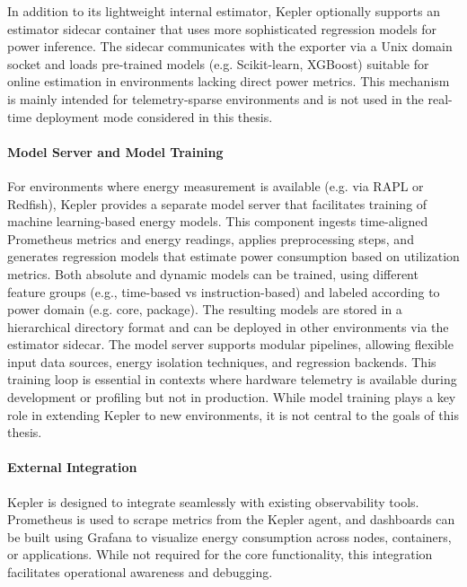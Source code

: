 In addition to its lightweight internal estimator, Kepler optionally supports an estimator sidecar container that uses more sophisticated regression models for power inference. The sidecar communicates with the exporter via a Unix domain socket and loads pre-trained models (e.g. Scikit-learn, XGBoost) suitable for online estimation in environments lacking direct power metrics. This mechanism is mainly intended for telemetry-sparse environments and is not used in the real-time deployment mode considered in this thesis.

\paragraph{Model Server and Model Training}

For environments where energy measurement is available (e.g. via RAPL or Redfish), Kepler provides a separate model server that facilitates training of machine learning-based energy models. This component ingests time-aligned Prometheus metrics and energy readings, applies preprocessing steps, and generates regression models that estimate power consumption based on utilization metrics. Both absolute and dynamic models can be trained, using different feature groups (e.g., time-based vs instruction-based) and labeled according to power domain (e.g. core, package). The resulting models are stored in a hierarchical directory format and can be deployed in other environments via the estimator sidecar. The model server supports modular pipelines, allowing flexible input data sources, energy isolation techniques, and regression backends. This training loop is essential in contexts where hardware telemetry is available during development or profiling but not in production. While model training plays a key role in extending Kepler to new environments\parencite{choochotkaewAdvancingCloudSustainability2023}, it is not central to the goals of this thesis.

\paragraph{External Integration}

Kepler is designed to integrate seamlessly with existing observability tools. Prometheus is used to scrape metrics from the Kepler agent, and dashboards can be built using Grafana to visualize energy consumption across nodes, containers, or applications. While not required for the core functionality, this integration facilitates operational awareness and debugging.

